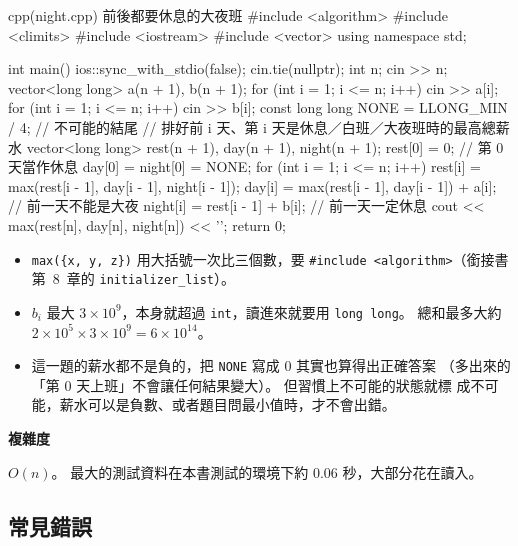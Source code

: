 \begin{example}[label=ex:night]{cpp}{(night.cpp) 前後都要休息的大夜班}
#include <algorithm>
#include <climits>
#include <iostream>
#include <vector>
using namespace std;

int main() {
    ios::sync_with_stdio(false);
    cin.tie(nullptr);
    int n;
    cin >> n;
    vector<long long> a(n + 1), b(n + 1);
    for (int i = 1; i <= n; i++) {
        cin >> a[i];
    }
    for (int i = 1; i <= n; i++) {
        cin >> b[i];
    }
    const long long NONE = LLONG_MIN / 4;   // 不可能的結尾
    // 排好前 i 天、第 i 天是休息／白班／大夜班時的最高總薪水
    vector<long long> rest(n + 1), day(n + 1), night(n + 1);
    rest[0] = 0;                        // 第 0 天當作休息
    day[0] = night[0] = NONE;
    for (int i = 1; i <= n; i++) {
        rest[i] = max({rest[i - 1], day[i - 1], night[i - 1]});
        day[i] = max(rest[i - 1], day[i - 1]) + a[i];      // 前一天不能是大夜
        night[i] = rest[i - 1] + b[i];                     // 前一天一定休息
    }
    cout << max({rest[n], day[n], night[n]}) << '\n';
    return 0;
}
\end{example}


\begin{itemize}
\item \texttt{max(\{x, y, z\})} 用大括號一次比三個數，要
\texttt{\#include <algorithm>}（銜接書第~8~章的 \texttt{initializer\_list}）。
\item $b_i$ 最大 $3 \times 10^9$，本身就超過 \texttt{int}，讀進來就要用
\texttt{long long}。 總和最多大約 $2 \times 10^5 \times 3 \times 10^9 =
6 \times 10^{14}$。
\item 這一題的薪水都不是負的，把 \texttt{NONE} 寫成 $0$ 其實也算得出正確答案
（多出來的「第 $0$ 天上班」不會讓任何結果變大）。 但習慣上不可能的狀態就標
成不可能，薪水可以是負數、或者題目問最小值時，才不會出錯。
\end{itemize}

\textbf{複雜度}

$O(n)$。 最大的測試資料在本書測試的環境下約 $0.06$ 秒，大部分花在讀入。

\subsection{常見錯誤}

